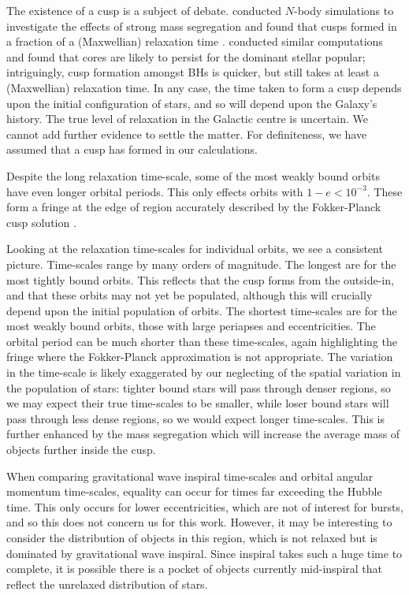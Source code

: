 \documentclass[useAMS,usedcolumn,usegraphicx,usenatbib]{mn2e}
\begin{document}
\begin{onecolumn}
The existence of a cusp is a subject of debate. \citet{Preto2010} conducted $N$-body simulations to investigate the effects of strong mass segregation \citep{Alexander2009, Keshet2009} and found that cusps formed in a fraction of a (Maxwellian) relaxation time \citep{Amaro-Seoane2011}. \citet{Gualandris2012} conducted similar computations and found that cores are likely to persist for the dominant stellar popular; intriguingly, cusp formation amongst BHs is quicker, but still takes at least a (Maxwellian) relaxation time. In any case, the time taken to form a cusp depends upon the initial configuration of stars, and so will depend upon the Galaxy's history. The true level of relaxation in the Galactic centre is uncertain. We cannot add further evidence to settle the matter. For definiteness, we have assumed that a cusp has formed in our calculations.

Despite the long relaxation time-scale, some of the most weakly bound orbits have even longer orbital periods. This only effects orbits with $1 - e < 10^{-3}$. These form a fringe at the edge of region accurately described by the Fokker-Planck cusp solution \citep{Spitzer1972}.

Looking at the relaxation time-scales for individual orbits, we see a consistent picture. Time-scales range by many orders of magnitude. The longest are for the most tightly bound orbits. This reflects that the cusp forms from the outside-in, and that these orbits may not yet be populated, although this will crucially depend upon the initial population of orbits. The shortest time-scales are for the most weakly bound orbits, those with large periapses and eccentricities. The orbital period can be much shorter than these time-scales, again highlighting the fringe where the Fokker-Planck approximation is not appropriate. The variation in the time-scale is likely exaggerated by our neglecting of the spatial variation in the population of stars: tighter bound stars will pass through denser regions, so we may expect their true time-scales to be smaller, while loser bound stars will pass through less dense regions, so we would expect longer time-scales. This is further enhanced by the mass segregation which will increase the average mass of objects further inside the cusp.

When comparing gravitational wave inspiral time-scales and orbital angular momentum time-scales, equality can occur for times far exceeding the Hubble time. This only occurs for lower eccentricities, which are not of interest for bursts, and so this does not concern us for this work. However, it may be interesting to consider the distribution of objects in this region, which is not relaxed but is dominated by gravitational wave inspiral. Since inspiral takes such a huge time to complete, it is possible there is a pocket of objects currently mid-inspiral that reflect the unrelaxed distribution of stars.


\end{onecolumn}
\end{document}
